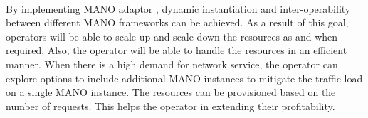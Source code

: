 \paragraph{}
By implementing MANO adaptor , dynamic instantiation and inter-operability between different MANO frameworks can be achieved. As a result of this goal, operators will be able to scale up and scale down the resources as and when required. Also, the operator will be able to handle the resources in an efficient manner. 
When there is a high demand for network service, the operator can explore options to include additional MANO instances to mitigate the traffic load on a single MANO instance. The resources can be provisioned based on the number of requests. This helps the operator in extending their profitability. 

























